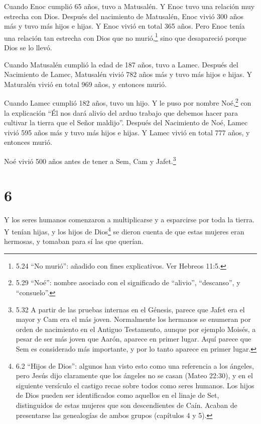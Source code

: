  Cuando Enoc cumplió 65 años, tuvo a Matusalén.
 Y Enoc tuvo una relación muy estrecha con Dios. Después
del nacimiento de Matusalén, Enoc vivió 300 años más y tuvo más hijos e
hijas.  Y Enoc vivió en total 365 años.  Pero
Enoc tenía una relación tan estrecha con Dios que no murió,\footnote{5.24
  ``No murió'': añadido con fines explicativos. Ver Hebreos 11:5.} sino
que desapareció porque Dios se lo llevó.

 Cuando Matusalén cumplió la edad de 187 años, tuvo a
Lamec.  Después del Nacimiento de Lamec, Matusalén vivió
782 años más y tuvo más hijos e hijas.  Y Maturalén vivió
en total 969 años, y entonces murió.

 Cuando Lamec cumplió 182 años, tuvo un hijo. 
Y le puso por nombre Noé,\footnote{5.29 ``Noé'': nombre asociado con el
  significado de ``alivio'', ``descanso'', y ``consuelo''.} con la
explicación ``Él nos dará alivio del arduo trabajo que debemos hacer
para cultivar la tierra que el Señor maldijo''.  Después
del Nacimiento de Noé, Lamec vivió 595 años más y tuvo más hijos e
hijas.  Y Lamec vivió en total 777 años, y entonces murió.

 Noé vivió 500 años antes de tener a Sem, Cam y
Jafet.\footnote{5.32 A partir de las pruebas internas en el Génesis,
  parece que Jafet era el mayor y Cam era el más joven. Normalmente los
  hermanos se enumeran por orden de nacimiento en el Antiguo Testamento,
  aunque por ejemplo Moisés, a pesar de ser más joven que Aarón, aparece
  en primer lugar. Aquí parece que Sem es considerado más importante, y
  por lo tanto aparece en primer lugar.}

\hypertarget{section-5}{%
\section{6}\label{section-5}}

 Y los seres humanos comenzaron a multiplicarse y a
esparcirse por toda la tierra. Y tenían hijas,  y los hijos
de Dios\footnote{6.2 ``Hijos de Dios'': algunos han visto esto como una
  referencia a los ángeles, pero Jesús dijo claramente que los ángeles
  no se casan (Mateo 22:30), y en el siguiente versículo el castigo
  recae sobre todos como seres humanos. Los hijos de Dios pueden ser
  identificados como aquellos en el linaje de Set, distinguidos de estas
  mujeres que son descendientes de Caín. Acaban de presentarse las
  genealogías de ambos grupos (capítulos 4 y 5).} se dieron cuenta de
que estas mujeres eran hermosas, y tomaban para sí las que querían.

